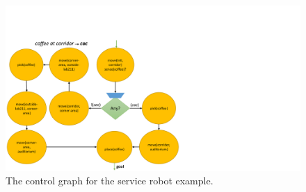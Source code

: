 \documentclass[letterpaper]{article}
\begin{document}
\begin{figure}
  \centering
  \includegraphics[width=.987\linewidth]{example1ControlGraph_1_1.pdf}  
  \vspace{-0.1in} 
  \caption{The control graph for the service robot example.}
  \label{fig:robotic-example-control-graph}
\end{figure}




\end{document}

